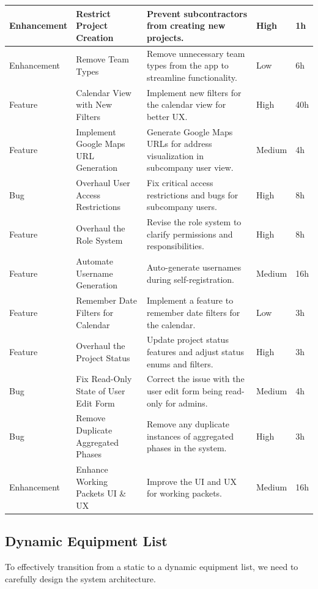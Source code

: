 \begin{longtable}{ | m{} | m{} | m{} | m{} | m{} | }
    \hline
    Enhancement & Restrict Project Creation & Prevent subcontractors from creating new projects. & High & 1h \\
    \hline
    Enhancement & Remove Team Types & Remove unnecessary team types from the app to streamline functionality. & Low & 6h \\
    \hline
    Feature & Calendar View with New Filters & Implement new filters for the calendar view for better UX. & High & 40h \\
    \hline
    Feature & Implement Google Maps URL Generation & Generate Google Maps URLs for address visualization in subcompany user view. & Medium & 4h \\
    \hline
    Bug & Overhaul User Access Restrictions & Fix critical access restrictions and bugs for subcompany users. & High & 8h \\
    \hline
    \rowcolor{blue!20} 
    Feature & Overhaul the Role System & Revise the role system to clarify permissions and responsibilities. & High & 8h \\
    \hline
    Feature & Automate Username Generation & Auto-generate usernames during self-registration. & Medium & 16h \\
    \hline
    Feature & Remember Date Filters for Calendar & Implement a feature to remember date filters for the calendar. & Low & 3h \\
    \hline
    Feature & Overhaul the Project Status & Update project status features and adjust status enums and filters. & High & 3h \\
    \hline
    Bug & Fix Read-Only State of User Edit Form & Correct the issue with the user edit form being read-only for admins. & Medium & 4h \\
    \hline
    Bug & Remove Duplicate Aggregated Phases & Remove any duplicate instances of aggregated phases in the system. & High & 3h \\
    \hline
    \rowcolor{blue!20} Enhancement & Enhance Working Packets UI \& UX & Improve the UI and UX for working packets. & Medium & 16h \\
    \hline
\end{longtable}

\subsection{Dynamic Equipment List}
To effectively transition from a static to a dynamic equipment list, we need to carefully design the system architecture.

